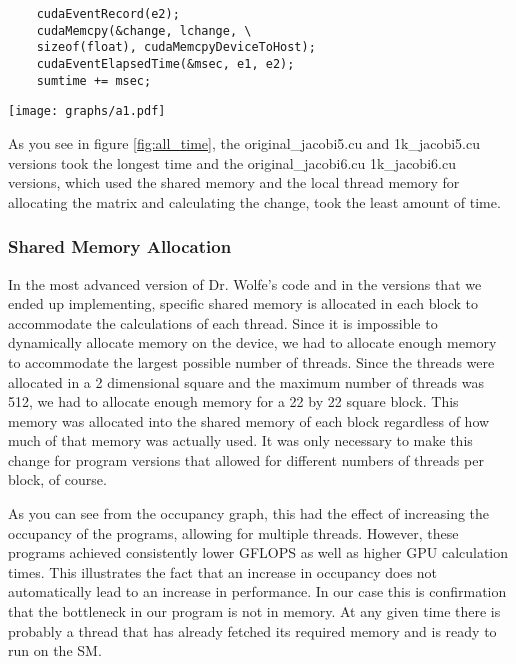 \documentclass[10pt]{article}
\makeatletter
\newenvironment{figurehere}
{\def\@captype{figure}}
{}
\makeatother
\begin{document}
\begin{multicols}{2}
  \cite{bib:wolfe}
  \begin{verbatim}
    cudaEventRecord(e2);
    cudaMemcpy(&change, lchange, \
    sizeof(float), cudaMemcpyDeviceToHost);
    cudaEventElapsedTime(&msec, e1, e2);
    sumtime += msec;
  \end{verbatim}

  \begin{figurehere}
    \centering
    \texttt{[image: graphs/a1.pdf]}
    \caption{}
    \label{fig:all_time}
  \end{figurehere}

  As you see in figure \ref{fig:all_time}, the original\_jacobi5.cu and 1k\_jacobi5.cu versions took the longest time and the original\_jacobi6.cu 1k\_jacobi6.cu versions, which used the shared memory and the local thread memory for allocating the matrix and calculating the change, took the least amount of time.

  \subsubsection{Shared Memory Allocation}%
  In the most advanced version of Dr. Wolfe's code and in the versions that we ended up implementing, specific shared memory is allocated in each block to accommodate the calculations of each thread.
  Since it is impossible to dynamically allocate memory on the device, we had to allocate enough memory to accommodate the largest possible number of threads.
  Since the threads were allocated in a 2 dimensional square and the maximum number of threads was 512, we had to allocate enough memory for a 22 by 22 square block.
  This memory was allocated into the shared memory of each block regardless of how much of that memory was actually used.
  It was only necessary to make this change for program versions that allowed for different numbers of threads per block, of course.

  As you can see from the occupancy graph, this had the effect of increasing the occupancy of the programs, allowing for multiple threads.
  However, these programs achieved consistently lower GFLOPS as well as higher GPU calculation times.
  This illustrates the fact that an increase in occupancy does not automatically lead to an increase in performance.
  In our case this is confirmation that the bottleneck in our program is not in memory.
  At any given time there is probably a thread that has already fetched its required memory and is ready to run on the SM.


\end{multicols}
\end{document}
